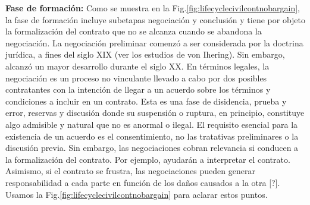 \documentclass[12pt]{report} %
\begin{document}
\textbf{Fase de formación:} Como se muestra en la Fig.\ref{fig:lifecyclecivilcontnobargain}, la fase de formación incluye subetapas negociación y conclusión y tiene por objeto la formalización del contrato que no se alcanza cuando se abandona la negociación. La negociación preliminar comenzó a ser considerada por la doctrina jurídica, a fines del siglo XIX (ver los estudios de von Ihering).  Sin embargo, alcanzó un mayor desarrollo durante el siglo XX. En términos legales, la negociación es un proceso no vinculante llevado a cabo por dos posibles contratantes con la intención de llegar a un acuerdo sobre los términos y condiciones a incluir en un contrato. Esta es una fase de disidencia, prueba y error, reservas y discusión donde su suspensión o ruptura, en principio, constituye algo admisible y natural que no es anormal o ilegal. El requisito esencial para la existencia de un acuerdo es el consentimiento, no las tratativas preliminares o la discusión previa. Sin embargo, las negociaciones cobran relevancia si conducen a la formalización del contrato. Por ejemplo, ayudarán a interpretar el contrato. Asimismo, si el contrato se frustra, las negociaciones pueden generar responsabilidad a cada parte en función de los daños causados a la otra [?]. Usamos la Fig.\ref{fig:lifecyclecivilcontnobargain} para aclarar estos puntos.
\end{document}
